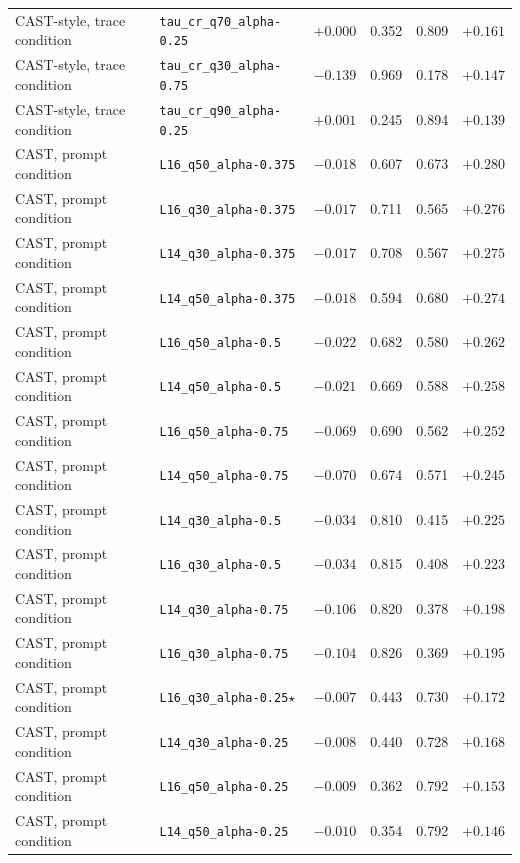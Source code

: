 {\begin{longtable}{l|l|c|cc|c}
CAST-style, trace condition & \texttt{tau\_cr\_q70\_alpha-0.25} & $+0.000$ & 0.352 & 0.809 & $+0.161$ \\
CAST-style, trace condition & \texttt{tau\_cr\_q30\_alpha-0.75} & $-0.139$ & 0.969 & 0.178 & $+0.147$ \\
CAST-style, trace condition & \texttt{tau\_cr\_q90\_alpha-0.25} & $+0.001$ & 0.245 & 0.894 & $+0.139$ \\
CAST, prompt condition & \texttt{L16\_q50\_alpha-0.375} & $-0.018$ & 0.607 & 0.673 & $+0.280$ \\
CAST, prompt condition & \texttt{L16\_q30\_alpha-0.375} & $-0.017$ & 0.711 & 0.565 & $+0.276$ \\
CAST, prompt condition & \texttt{L14\_q30\_alpha-0.375} & $-0.017$ & 0.708 & 0.567 & $+0.275$ \\
CAST, prompt condition & \texttt{L14\_q50\_alpha-0.375} & $-0.018$ & 0.594 & 0.680 & $+0.274$ \\
CAST, prompt condition & \texttt{L16\_q50\_alpha-0.5} & $-0.022$ & 0.682 & 0.580 & $+0.262$ \\
CAST, prompt condition & \texttt{L14\_q50\_alpha-0.5} & $-0.021$ & 0.669 & 0.588 & $+0.258$ \\
CAST, prompt condition & \texttt{L16\_q50\_alpha-0.75} & $-0.069$ & 0.690 & 0.562 & $+0.252$ \\
CAST, prompt condition & \texttt{L14\_q50\_alpha-0.75} & $-0.070$ & 0.674 & 0.571 & $+0.245$ \\
CAST, prompt condition & \texttt{L14\_q30\_alpha-0.5} & $-0.034$ & 0.810 & 0.415 & $+0.225$ \\
CAST, prompt condition & \texttt{L16\_q30\_alpha-0.5} & $-0.034$ & 0.815 & 0.408 & $+0.223$ \\
CAST, prompt condition & \texttt{L14\_q30\_alpha-0.75} & $-0.106$ & 0.820 & 0.378 & $+0.198$ \\
CAST, prompt condition & \texttt{L16\_q30\_alpha-0.75} & $-0.104$ & 0.826 & 0.369 & $+0.195$ \\
CAST, prompt condition & \texttt{L16\_q30\_alpha-0.25}$\star$ & $-0.007$ & 0.443 & 0.730 & $+0.172$ \\
CAST, prompt condition & \texttt{L14\_q30\_alpha-0.25} & $-0.008$ & 0.440 & 0.728 & $+0.168$ \\
CAST, prompt condition & \texttt{L16\_q50\_alpha-0.25} & $-0.009$ & 0.362 & 0.792 & $+0.153$ \\
CAST, prompt condition & \texttt{L14\_q50\_alpha-0.25} & $-0.010$ & 0.354 & 0.792 & $+0.146$ \\

\end{longtable}}
